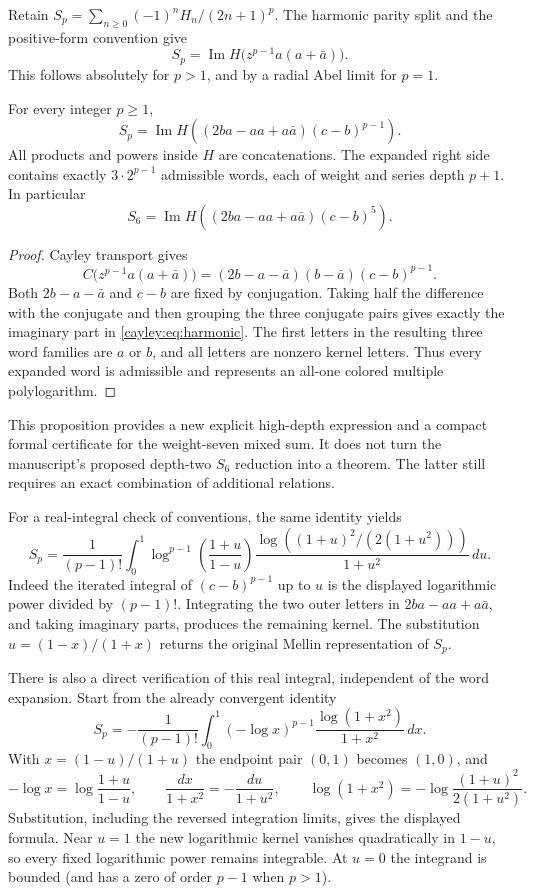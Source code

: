 Retain
$S_p=\sum_{n\ge0}(-1)^nH_n/(2n+1)^p$.
The harmonic parity split and the positive-form convention give
\[
 S_p=\operatorname{Im}H\bigl(z^{p-1}a(a+\bar a)\bigr).
\]
This follows absolutely for $p>1$, and by a radial Abel limit for
$p=1$.

\begin{proposition}
\label{cayley:prop:harmonic}
For every integer $p\ge1$,
\begin{equation}\label{cayley:eq:harmonic}
 S_p=\operatorname{Im}H\left((2ba-aa+a\bar a)(c-b)^{p-1}\right).
\end{equation}
All products and powers inside $H$ are concatenations.
The expanded right side contains exactly $3\cdot2^{p-1}$
admissible words, each of weight and series depth $p+1$.
In particular
\[
 \boxed{\quad
 S_6=\operatorname{Im}H\left((2ba-aa+a\bar a)(c-b)^5\right).
 \quad}
\]
\end{proposition}

\begin{proof}
Cayley transport gives
\[
 C\bigl(z^{p-1}a(a+\bar a)\bigr)
 =(2b-a-\bar a)(b-\bar a)(c-b)^{p-1}.
\]
Both $2b-a-\bar a$ and $c-b$ are fixed by conjugation.
Taking half the difference with the conjugate and then grouping
the three conjugate pairs gives exactly the imaginary part in
\eqref{cayley:eq:harmonic}.  The first letters in the resulting
three word families are $a$ or $b$, and all letters are nonzero
kernel letters.  Thus every expanded word is admissible and
represents an all-one colored multiple polylogarithm.
\end{proof}

This proposition provides a new explicit high-depth expression
and a compact formal certificate for the weight-seven mixed sum.
It does not turn the manuscript's proposed depth-two $S_6$
reduction into a theorem.  The latter still requires an exact
combination of additional relations.

For a real-integral check of conventions, the same identity yields
\[
 S_p=\frac1{(p-1)!}\int_0^1
 \log^{p-1}\!\left(\frac{1+u}{1-u}\right)
 \frac{\log\!\left((1+u)^2/(2(1+u^2))\right)}{1+u^2}\,du.
\]
Indeed the iterated integral of $(c-b)^{p-1}$ up to $u$ is the
displayed logarithmic power divided by $(p-1)!$.
Integrating the two outer letters in
$2ba-aa+a\bar a$, and taking imaginary parts, produces the
remaining kernel.  The substitution $u=(1-x)/(1+x)$ returns
the original Mellin representation of $S_p$.

There is also a direct verification of this real integral, independent
of the word expansion.  Start from the already convergent identity
\[
 S_p=-\frac1{(p-1)!}\int_0^1
 (-\log x)^{p-1}\frac{\log(1+x^2)}{1+x^2}\,dx.
\]
With $x=(1-u)/(1+u)$ the endpoint pair $(0,1)$ becomes $(1,0)$, and
\[
 -\log x=\log\frac{1+u}{1-u},\qquad
 \frac{dx}{1+x^2}=-\frac{du}{1+u^2},\qquad
 \log(1+x^2)=-\log\frac{(1+u)^2}{2(1+u^2)}.
\]
Substitution, including the reversed integration limits, gives the
displayed formula.  Near $u=1$ the new logarithmic kernel vanishes
quadratically in $1-u$, so every fixed logarithmic power remains
integrable.  At $u=0$ the integrand is bounded (and has a zero of
order $p-1$ when $p>1$).

